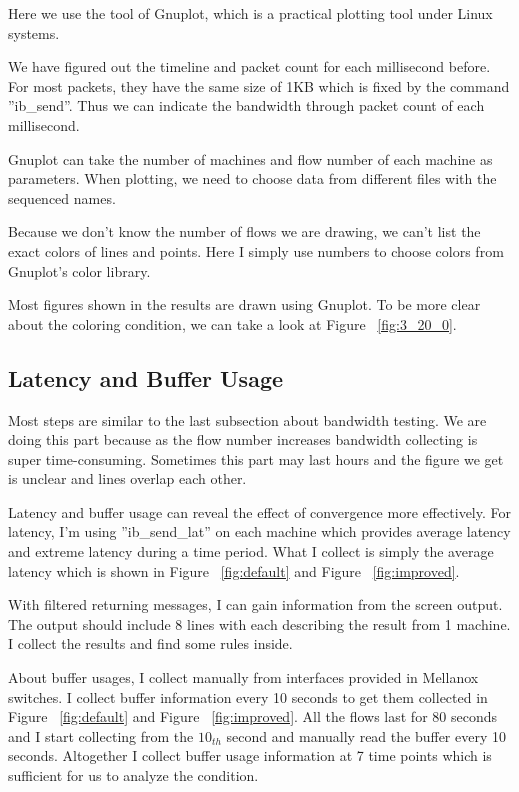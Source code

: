 \documentclass[12pt,a4paper]{article}
\begin{document}
Here we use the tool of Gnuplot, which is a practical plotting tool under Linux systems.

We have figured out the timeline and packet count for each millisecond before.
For most packets, they have the same size of 1KB which is fixed by the command ''ib\_send''.
Thus we can indicate the bandwidth through packet count of each millisecond.

Gnuplot can take the number of machines and flow number of each machine as parameters.
When plotting, we need to choose data from different files with the sequenced names.

Because we don't know the number of flows we are drawing, we can't list the exact colors of lines and points.
Here I simply use numbers to choose colors from Gnuplot's color library.

Most figures shown in the results are drawn using Gnuplot.
To be more clear about the coloring condition, we can take a look at Figure ~\ref{fig:3_20_0}.

\subsection{Latency and Buffer Usage}

Most steps are similar to the last subsection about bandwidth testing.
We are doing this part because as the flow number increases bandwidth collecting is super time-consuming.
Sometimes this part may last hours and the figure we get is unclear and lines overlap each other.

Latency and buffer usage can reveal the effect of convergence more effectively.
For latency, I'm using ''ib\_send\_lat'' on each machine which provides average latency and extreme latency during a time period.
What I collect is simply the average latency which is shown in Figure ~\ref{fig:default} and Figure ~\ref{fig:improved}.

With filtered returning messages, I can gain information from the screen output.
The output should include 8 lines with each describing the result from 1 machine.
I collect the results and find some rules inside.

About buffer usages, I collect manually from interfaces provided in Mellanox switches.
I collect buffer information every 10 seconds to get them collected in Figure ~\ref{fig:default} and Figure ~\ref{fig:improved}.
All the flows last for 80 seconds and I start collecting from the $10_{th}$ second and manually read the buffer every 10 seconds.
Altogether I collect buffer usage information at 7 time points which is sufficient for us to analyze the condition.
\end{document}
